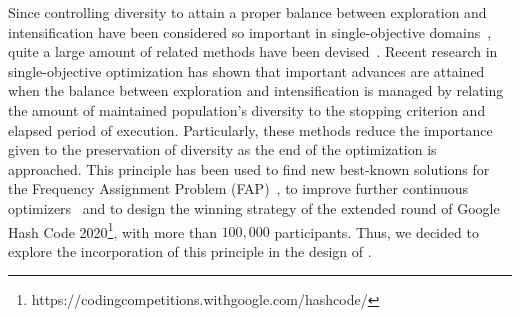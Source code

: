 Since controlling diversity to attain a proper balance between exploration and intensification have been considered 
so important in single-objective domains~\cite{lin2009auto},
quite a large amount of related methods have been devised~\cite{Joel:Crepinsek}. 
%
%
%
%
%
%
Recent research in single-objective optimization has shown that important advances are attained when the
balance between exploration and intensification is managed by relating the amount of maintained population's diversity to 
the stopping criterion and elapsed period of execution.
%
Particularly, these methods reduce the importance given to the preservation of diversity as the end of the optimization
is approached.
%
This principle has been used to find new best-known solutions for the Frequency Assignment Problem 
(FAP)~\cite{segura2016improving}, to improve further continuous optimizers~\cite{castillo2019differential} and
to design the winning strategy of the extended round of Google Hash Code 
2020\footnote{https://codingcompetitions.withgoogle.com/hashcode/}, with more than $100,000$ participants.
%
Thus, we decided to explore the incorporation of this principle in the design of \MOEAS{}.
%
%
%

